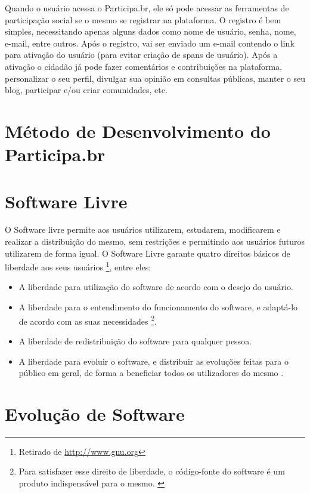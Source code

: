 Quando o usuário acessa o Participa.br, ele só pode acessar as ferramentas de participação social se o mesmo se registrar na plataforma. O registro é bem simples, necessitando apenas alguns dados como nome de usuário, senha, nome, e-mail, entre outros. Após o registro, vai ser enviado um e-mail contendo o link para ativação do usuário (para evitar criação de spans de usuário). Após a ativação o cidadão já pode fazer comentários e contribuições na plataforma, personalizar o seu perfil, divulgar sua opinião em consultas públicas, manter o seu blog, participar e/ou criar comunidades, etc.

\section{Método de Desenvolvimento do Participa.br}

\section{Software Livre}

O Software livre permite aos usuários utilizarem, estudarem, modificarem e realizar a distribuição do mesmo, sem restrições e permitindo aos usuários futuros utilizarem de forma igual. %
O Software Livre garante quatro direitos básicos de liberdade aos seus usuários \footnote{Retirado de \url{http://www.gnu.org}}, entre eles:

\begin{itemize}
\item A liberdade para utilização do software de acordo com o desejo do usuário.
\item A liberdade para o entendimento do funcionamento do software, e adaptá-lo de acordo com as suas necessidades \footnote{Para satisfazer esse direito de liberdade, o código-fonte do software é um produto indispensável para o mesmo. \label{ft:codfonte}}.
\item A liberdade de redistribuição do software para qualquer pessoa.
\item A liberdade para evoluir o software, e distribuir as evoluções feitas para o público em geral, de forma a beneficiar todos os utilizadores do mesmo .
\end{itemize}

\section{Evolução de Software}


